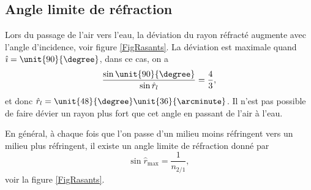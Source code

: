 \subsection{Angle limite de réfraction}

Lors du passage de l'air vers l'eau, la déviation du rayon réfracté augmente avec l'angle d'incidence, voir figure \ref{FigRasants}. La déviation est maximale quand $\hat\imath=\unit{90}{\degree}$, dans ce cas, on a 
\[ 
  \frac{ \sin\unit{90}{\degree} }{ \sin\hat r_{l} }=\frac{ 4 }{ 3 },
\]
et donc $\hat r_{l}=\unit{48}{\degree}\unit{36}{\arcminute}$. Il n'est pas possible de faire dévier un rayon plus fort que cet angle en passant de l'air à l'eau.

En général, à chaque fois que l'on passe d'un milieu moins réfringent vers un milieu plus réfringent, il existe un angle limite de réfraction donné par
\[ 
  \sin\hat r_{\text{max}}=\frac{1}{ n_{2/1} },
\]
voir la figure \ref{FigRasants}. 

\newcommand{\PreFigAngleAugmente}{%
\pstGeonode(0,0){O}(2,0){P}
\pstRotation[RotAngle=90]{O}{P}[Qi]
\pstHomO[HomCoef=0.5]{O}{Qi}[Q]
\pstRotation[RotAngle=180]{O}{P}[R]
\pstHomO[HomCoef=-1]{O}{Q}[S]

\def\interIndiceUn{0.99}
\def\interIndiceDeux{1}

\pstRotation[RotAngle=-18]{O}{R}[Ri]		%
    \pstDioptre{O}{P}{Ri}{\interIndiceUn}{\interIndiceDeux}{Ris}{Rie}	%

\pstRotation[RotAngle=-36]{O}{R}[Rj]		%
    \pstDioptre{O}{P}{Rj}{\interIndiceUn}{\interIndiceDeux}{Rjs}{Rje}	%

\pstRotation[RotAngle=-54]{O}{R}[Rk]		%
    \pstDioptre{O}{P}{Rk}{\interIndiceUn}{\interIndiceDeux}{Rks}{Rke}	%

\pstRotation[RotAngle=-72]{O}{R}[Rl]		%
    \pstDioptre{O}{P}{Rl}{\interIndiceUn}{\interIndiceDeux}{Rls}{Rle}	%

\pstRotation[RotAngle=-90]{O}{R}[Rm]		%
    \pstDioptre{O}{P}{Rm}{\interIndiceUn}{\interIndiceDeux}{Rms}{Rme}	%

\pstRotation[RotAngle=0]{O}{R}[Rn]		%
    \pstDioptre{O}{P}{Rn}{\interIndiceUn}{\interIndiceDeux}{Rns}{Rne}	%
}



